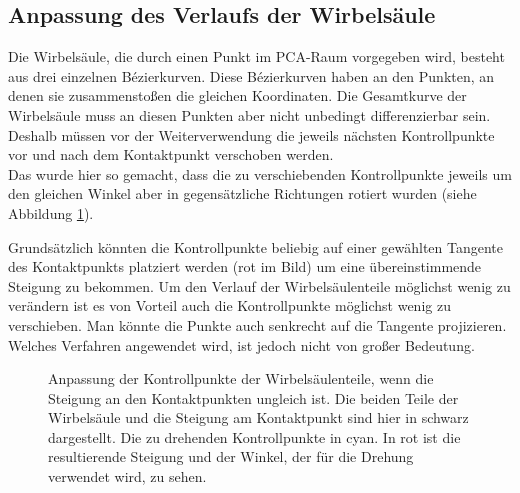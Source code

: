 \subsection{Anpassung des Verlaufs der Wirbelsäule}
\label{smooth_spine}

Die Wirbelsäule, die durch einen Punkt im PCA-Raum vorgegeben wird, besteht aus drei einzelnen Bézierkurven. Diese Bézierkurven haben an den Punkten, an denen sie zusammenstoßen die gleichen Koordinaten. Die Gesamtkurve der Wirbelsäule muss an diesen Punkten aber nicht unbedingt differenzierbar sein.
Deshalb müssen vor der Weiterverwendung die jeweils nächsten Kontrollpunkte vor und nach dem Kontaktpunkt verschoben werden. \\
Das wurde hier so gemacht, dass die zu verschiebenden Kontrollpunkte jeweils um den gleichen Winkel aber in gegensätzliche Richtungen rotiert wurden (siehe Abbildung \ref{smooth_spine}). 

Grundsätzlich könnten die Kontrollpunkte beliebig auf einer gewählten Tangente des Kontaktpunkts platziert werden (rot im Bild) um eine übereinstimmende Steigung zu bekommen. Um den Verlauf der Wirbelsäulenteile möglichst wenig zu verändern ist es von Vorteil auch die Kontrollpunkte möglichst wenig zu verschieben. Man könnte die Punkte \zb auch senkrecht auf die Tangente projizieren. Welches Verfahren angewendet wird, ist jedoch nicht von großer Bedeutung. 

\begin{figure}
 \qquad
 \caption{Anpassung der Kontrollpunkte der Wirbelsäulenteile, wenn die Steigung an den Kontaktpunkten ungleich ist. Die beiden Teile der Wirbelsäule und die Steigung am Kontaktpunkt sind hier in schwarz dargestellt. Die zu drehenden Kontrollpunkte in cyan. In rot ist die resultierende Steigung und der Winkel, der für die Drehung verwendet wird, zu sehen.}
 \label{smooth_spine}
\end{figure}


